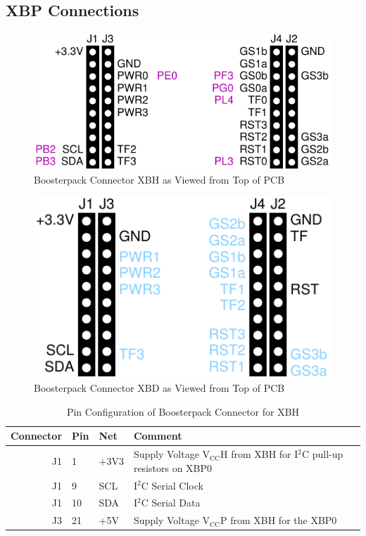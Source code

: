 \documentclass[twoside,11pt]{cergdoc}
\begin{document}
\begin{appendix}
\chapter{XBP Connections}

\begin{figure}[ht]
  \begin{center}
    \includegraphics[scale=1]{figures/xbp-xbh}
    \caption{Boosterpack Connector XBH as Viewed from Top of PCB}
  \end{center}
\end{figure}

\begin{figure}[ht]
  \begin{center}
    \includegraphics[scale=1]{figures/xbp-xbd}
    \caption{Boosterpack Connector XBD as Viewed from Top of PCB}
  \end{center}
\end{figure}
\begin{table}[ht]
  \begin{center}
    \caption{Pin Configuration of Boosterpack Connector for XBH}
    \begin{tabular}{rlll}
      Connector & Pin  & Net         & Comment  \\ \hline
       J1 & 1  & +3V3      & Supply Voltage $\mathrm{V_{CC}H}$ from XBH for I$^2$C pull-up resistors on XBP0 \\
       J1 & 9  & SCL       & I$^2$C Serial Clock  \\
       J1 & 10 & SDA       & I$^2$C Serial Data \\ 
       J3 & 21 & +5V       & Supply Voltage $\mathrm{V_{CC}P}$ from XBH for the XBP0 \\ \hline


\end{tabular}
\end{center}
\end{table}
\end{appendix}
\end{document}

